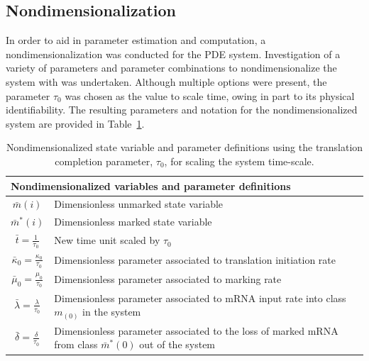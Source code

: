\documentclass[review]{elsarticle}
\begin{document}
\subsection{Nondimensionalization}
In order to aid in parameter estimation and computation, a nondimensionalization was conducted for the PDE system.  Investigation of a variety of parameters and parameter combinations to nondimensionalize the system with was undertaken.
Although multiple options were present, the parameter $\tau_0$ was chosen as the value to scale time, owing in part to its physical identifiability.
The resulting parameters and notation for the nondimensionalized system are provided in Table~\ref{tab:nond_params}.

\begin{table}
\begin{tabular}{|c l|}
\hline
\multicolumn{2}{|l|}{\textbf{Nondimensionalized variables and parameter definitions}} \\ \hline \hline
$\bar{m}(i)$ &  Dimensionless unmarked state variable \\
$\bar{m}^{*}(i)$ &  Dimensionless marked state variable \\
$\bar{t}=\frac{1}{\tau_{0}}$ & New time unit scaled by $\tau_{0}$ \\ 
$\bar{\kappa}_0=\frac{\kappa_{0}}{\tau_{0}}$ & Dimensionless parameter
associated to translation initiation rate \\
$\bar{\mu}_0=\frac{\mu_{0}}{\tau_{0}}$ & Dimensionless parameter associated
to marking rate \\
$\bar{\lambda}=\frac{\lambda}{\tau_{0}}$ & Dimensionless parameter associated
to mRNA input rate into class $m_(0)$ in the system\\
$\bar{\delta}=\frac{\delta}{\tau_{0}}$ & Dimensionless parameter associated
to the loss of marked mRNA from class $\bar{m}^*(0)$ out of the system\\ \hline
\end{tabular}
\caption{Nondimensionalized state variable and parameter definitions using the translation completion parameter, $\tau_0$, for scaling the system time-scale.}
\label{tab:nond_params}
\end{table}
\end{document}
